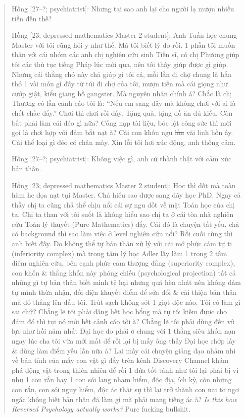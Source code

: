 \documentclass[12pt]{article}
\begin{document}
\begin{quotation}
	{\sf Hồng [27--?; psychiatrist]}: Nhưng tại sao anh lại cho người lạ mượn nhiều tiền đến thế?
	
	{\sf Hồng [23; depressed mathematics Master 2 student]}: Anh Tuấn học chung Master với tôi cũng hỏi y như thế. Mà tôi biết lý do rồi. 1 phần tôi muốn thân với cái nhóm các anh chị nghiên cứu sinh Tiến sĩ, có chị Phương giúp tôi các thủ tục tiếng Pháp lúc mới qua, nên tôi thấy giúp được gì giúp. Nhưng cái thằng chó này chả giúp gì tôi cả, mỗi lần đi chợ chung là hắn thó 1 vài món gì đấy từ túi đi chợ của tôi, mượn tiền mà cái giọng như cướp giật, kiểu giang hồ gangster. Mà nguyên nhân chính á? Chắc là chị Thương có lần cảnh cáo tôi là: ``Nếu em sang đây mà không chơi với ai là chết chắc đấy.'' Chơi thì chơi rồi đấy. Tặng quà, tặng đồ ăn đủ kiểu. Còn bắt phải làm cái đéo gì nữa? Cống nạp tài liệu, bóc lột công sức thì mới gọi là chơi hợp với đám bắt nạt à? Cái con khốn ngu \st{lồn} vãi linh hồn ấy. Cái thể loại gì đéo có chân mày. Xin lỗi tôi hơi xúc động, anh thông cảm.
	
	{\sf Hồng [27--?; psychiatrist]}: Không việc gì, anh cứ thành thật với cảm xúc bản thân.
	
	{\sf Hồng [23; depressed mathematics Master 2 student]}: Học thì dốt mà toàn hăm he dọa nạt tụi Master. Chả hiểu sao được sang đây học PhD. Ngay cả thầy chị ta cũng chả thể chịu nổi cái sự ngu dốt về mặt Toán học của chị ta. Chị ta than với tôi suốt là không hiểu sao chị ta ở cái tòa nhà nghiên cứu Toán lý thuyết (Pure Mathematics) đấy. Cái đó là chuyện tất yếu, chả có background thì sao làm việc ở level nghiên cứu nổi? Rồi cuối cùng thì anh biết đấy. Do không thể tự bản thân xử lý với cái mớ phức cảm tự ti (inferiority complex) mà trong tâm lý học Adler lấy làm 1 trong 2 tâm điểm nghiên cứu, bên cạnh phức cảm thượng đẳng (superiority complex), con khốn \& thằng khốn này phóng chiếu (psychological projection) tất cả những gì tự bản thân biết mình tệ hại nhưng quá hèn nhát nên không dám tự mình thừa nhận, đối diện khuyết điểm để sửa đổi \& cải thiện bản thân mà đổ thẳng lên đầu tôi. Trút sạch không sót 1 giọt độc nào. Tôi có làm gì sai chứ? Chẳng lẽ tôi phải dâng hết học bổng mà tự tôi kiếm được cho đám đó thì tụi nó mới hết cảnh cáo tôi à? Chẳng lẽ tôi phải dùng đến vũ lực như hồi năm nhất Đại học do phải ở chung với 1 thằng siêu khốn nạn ngay lúc cha tôi vừa mới mất để rồi lại bị mấy ông thầy Đại học chớp lấy \& dùng làm điểm yếu lần nữa à? Lại mấy cái chuyện giảng đạo nhảm nhí về bản tính của mấy con vật gì đấy trên kênh Discovery Channel khám phá động vật trong thiên nhiên để rồi 1 đứa tốt tánh như tôi lại phải bị ví như 1 con rắn hay 1 con sói lang nham hiểm, độc địa, ích kỷ, còn những con rắn, con sói nguy hiểm, độc ác thật sự thì lại trở thành con nai tơ ngơ ngác không biết bản thân đã làm gì mà phải mang tiếng ác à? {\it Is this how Reversed Psychology actually works?} Pure fucking bullshit.
	

\end{quotation}
\end{document}
